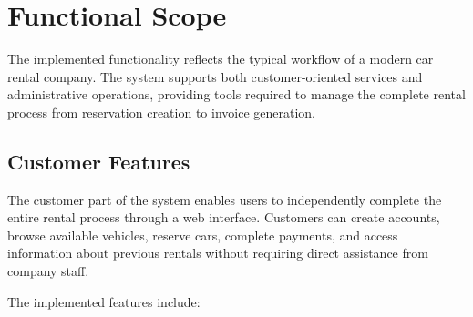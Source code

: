 \section{Functional Scope}

The implemented functionality reflects the typical workflow of a modern car rental company. The system supports both customer-oriented services and administrative operations, providing tools required to manage the complete rental process from reservation creation to invoice generation.

\subsection{Customer Features}

The customer part of the system enables users to independently complete the entire rental process through a web interface. Customers can create accounts, browse available vehicles, reserve cars, complete payments, and access information about previous rentals without requiring direct assistance from company staff.

The implemented features include:

